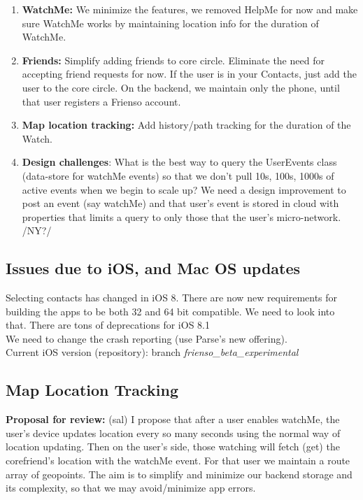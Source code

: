 \begin{enumerate}
\item \textbf{WatchMe:}  We minimize the features, we removed HelpMe for now and make sure WatchMe works by maintaining location info for the duration of WatchMe.
\item \textbf{Friends:} Simplify adding friends to core circle. Eliminate the need for accepting friend requests for now. If the user is in your Contacts, just add the user to the core circle.  On the backend, we maintain only the phone, until that user registers a Frienso account.
\item \textbf{Map location tracking:} Add history/path tracking for the duration of the Watch.
\item \textbf{Design challenges}: What is the best way to query the UserEvents class (data-store for watchMe events)
so that we don't pull 10s, 100s, 1000s of active events when we begin to scale up? We need a design improvement
to post an event (say watchMe) and that user's event is stored in cloud with properties that limits a query to only those that the user's micro-network. /NY?/

\end{enumerate}

\subsection{Issues due to iOS, and Mac OS updates}
Selecting contacts has changed in iOS 8.  There are now new requirements for building the apps to be both 32 and 64 bit compatible. We need to look into that. There are tons of deprecations for iOS 8.1\\

We need to change the crash reporting (use Parse's new offering). \\

Current iOS version (repository): branch \emph{ frienso\_beta\_experimental} \\

\subsection{Map Location Tracking}
\noindent\textbf{Proposal for review:} (sal) I propose that after a user enables watchMe, the user's device
updates location every so many seconds using the normal way of location updating. Then on the user's side, those
watching will fetch (get) the corefriend's location with the watchMe event. For that user we maintain 
a route array of geopoints.  The aim is to simplify and minimize our backend storage and its complexity,
so that we may avoid/minimize app errors.

